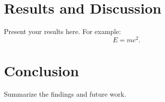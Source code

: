 \chapter{Results and Discussion}
Present your results here. For example:
\begin{equation}
  E = mc^2.
\end{equation}

\chapter{Conclusion}
Summarize the findings and future work.

